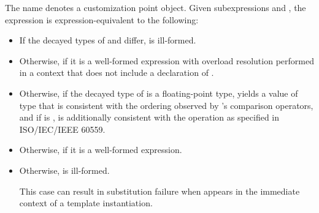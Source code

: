 %
\pnum
The name  denotes
a customization point object.
Given subexpressions  and ,
the expression 
is expression-equivalent to the following:
\begin{itemize}
\item
  If the decayed types of  and  differ,
   is ill-formed.
\item
  Otherwise, 
  if it is a well-formed expression
  with overload resolution performed in a context
  that does not include a declaration of .
\item
  Otherwise, if the decayed type  of  is
  a floating-point type,
  yields a value of type 
  that is consistent with the ordering
  observed by 's comparison operators, and
  if  is ,
  is additionally consistent with the  operation
  as specified in ISO/IEC/IEEE 60559.
\item
  Otherwise, 
  if it is a well-formed expression.
\item
  Otherwise,  is ill-formed.
  \begin{note}
  This case can result in substitution failure
  when  appears in the immediate context
  of a template instantiation.
  \end{note}
\end{itemize}

